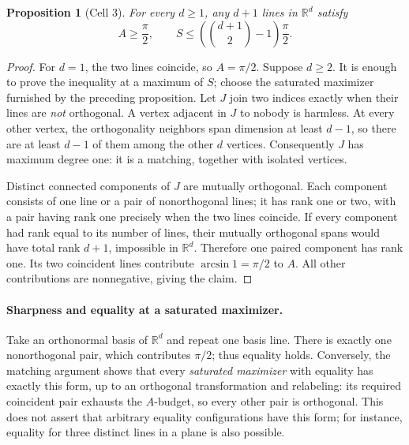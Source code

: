 \documentclass[11pt]{article}
\newtheorem{proposition}{Proposition}
\begin{document}
\begin{proposition}[Cell 3]
For every $d\geq1$, any $d+1$ lines in $\mathbb R^d$ satisfy
\[
 A\geq\frac\pi2,
 \qquad
 S\leq\left(\binom{d+1}{2}-1\right)\frac\pi2.
\]
\end{proposition}
\begin{proof}
For $d=1$, the two lines coincide, so $A=\pi/2$.  Suppose $d\geq2$.
It is enough to prove the inequality at a maximum of $S$; choose
the saturated maximizer furnished by the preceding proposition.
Let $J$ join two indices exactly when their lines are
\emph{not} orthogonal.  A vertex adjacent in $J$ to nobody is
harmless.  At every other vertex, the orthogonality neighbors span
dimension at least $d-1$, so there are at least $d-1$ of them among
the other $d$ vertices.  Consequently $J$ has maximum degree one:
it is a matching, together with isolated vertices.

Distinct connected components of $J$ are mutually orthogonal.
Each component consists of one line or a pair of nonorthogonal lines;
it has rank one or two, with a pair having rank one precisely when
the two lines coincide.  If every component had rank equal to its
number of lines, their mutually orthogonal spans would have total
rank $d+1$, impossible in $\mathbb R^d$.  Therefore one paired
component has rank one.  Its two coincident lines contribute
$\arcsin1=\pi/2$ to $A$.  All other contributions are nonnegative,
giving the claim.
\end{proof}

\paragraph{Sharpness and equality at a saturated maximizer.}
Take an orthonormal basis of $\mathbb R^d$ and repeat one basis line.
There is exactly one nonorthogonal pair, which contributes $\pi/2$;
thus equality holds.  Conversely, the matching argument shows that
every \emph{saturated maximizer} with equality has exactly this form,
up to an orthogonal transformation and relabeling: its required
coincident pair exhausts the $A$-budget, so every other pair is
orthogonal.  This does not assert that arbitrary equality
configurations have this form; for instance, equality for three
distinct lines in a plane is also possible.
\end{document}
